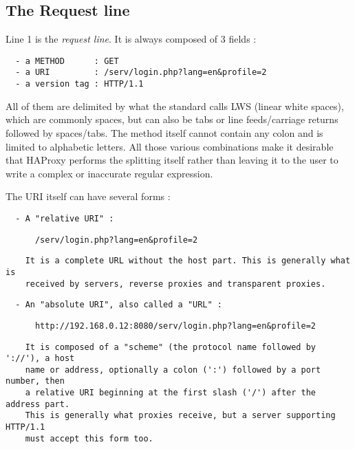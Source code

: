 
\subsection{The Request line}

Line 1 is the \emph{request line}. It is always composed of 3 fields :

\begin{verbatim}
  - a METHOD      : GET
  - a URI         : /serv/login.php?lang=en&profile=2
  - a version tag : HTTP/1.1
\end{verbatim}


All of them are delimited by what the standard calls LWS (linear white spaces),
which are commonly spaces, but can also be tabs or line feeds/carriage returns
followed by spaces/tabs. The method itself cannot contain any colon \CHAR{:} and
is limited to alphabetic letters. All those various combinations make it
desirable that HAProxy performs the splitting itself rather than leaving it to
the user to write a complex or inaccurate regular expression.


The URI itself can have several forms :

\begin{verbatim}
  - A "relative URI" :
\end{verbatim}

\begin{verbatim}
      /serv/login.php?lang=en&profile=2
\end{verbatim}

\begin{verbatim}
    It is a complete URL without the host part. This is generally what is
    received by servers, reverse proxies and transparent proxies.
\end{verbatim}

\begin{verbatim}
  - An "absolute URI", also called a "URL" :
\end{verbatim}

\begin{verbatim}
      http://192.168.0.12:8080/serv/login.php?lang=en&profile=2
\end{verbatim}

\begin{verbatim}
    It is composed of a "scheme" (the protocol name followed by '://'), a host
    name or address, optionally a colon (':') followed by a port number, then
    a relative URI beginning at the first slash ('/') after the address part.
    This is generally what proxies receive, but a server supporting HTTP/1.1
    must accept this form too.
\end{verbatim}

